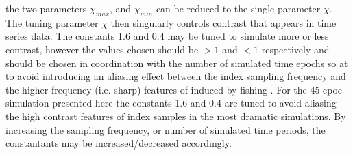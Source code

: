 the two-parameters $\chi_{max}$, and $\chi_{min}$ can be reduced to the single
parameter $\chi$. The tuning parameter $\chi$ then singularly controls contrast
that appears in time series data. The constants 1.6 and 0.4 may be tuned to 
simulate more or less contrast, however the values chosen should be $>1$ and $<1$ 
respectively and should be chosen in coordination with the number of simulated time 
epochs so at to avoid introducing an aliasing effect between the index sampling 
frequency and the higher frequency (i.e. sharp) features of induced by fishing 
\cite{shannon_communication_1998, mclean_nyquistovercoming_2005}. For 
the 45 epoc simulation presented here the constants 1.6 and 0.4 %
are tuned to avoid aliasing the high contrast features of index samples in the 
most dramatic simulations. By increasing the sampling frequency, or number of 
simulated time periods, the constantants may be increased/decreased accordingly. 


